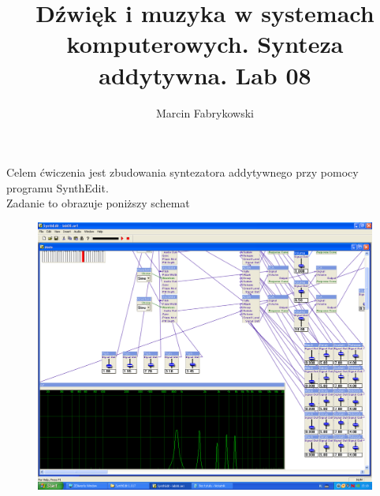 \documentclass[a4paper,12pt]{article}
\title{Dźwięk i muzyka w systemach komputerowych. Synteza addytywna. Lab 08}
\author{Marcin Fabrykowski}
\date{}
\begin{document}
\maketitle
\newpage
Celem ćwiczenia jest zbudowania syntezatora addytywnego przy pomocy programu SynthEdit.\\
Zadanie to obrazuje poniższy schemat
\begin{figure}[h]
\hspace{-2.5cm}
\includegraphics[scale=0.4]{lab08.png}
\end{figure}
\end{document}
